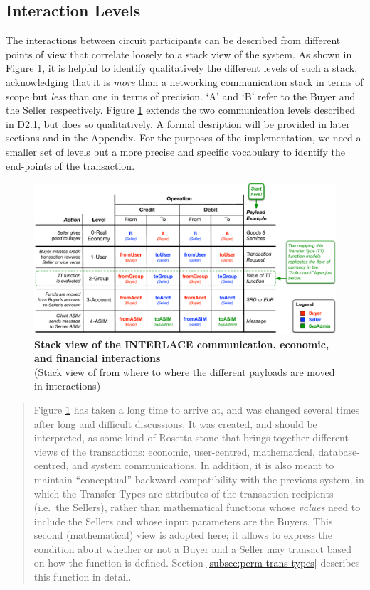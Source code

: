 \subsection{Interaction Levels}
\label{sec:intlevels}
The interactions between circuit participants can be described from different points of view that correlate loosely to a stack view of the system. As shown in Figure \ref{fig:stack}, it is helpful to identify qualitatively the different levels of such a stack, acknowledging that it is \emph{more} than a networking communication stack in terms of scope but \emph{less} than one in terms of precision. `A' and `B' refer to the Buyer and the Seller respectively. Figure \ref{fig:stack} extends the two communication levels described in D2.1, but does so qualitatively. A formal desription will be provided in later sections and in the Appendix. For the purposes of the implementation, we need a smaller set of levels but a more precise and specific vocabulary to identify the end-points of the transaction.
\begin{figure}[H]
\centering
\includegraphics[width=17.5cm]{Figures/Stack}
\caption{\small\textbf{Stack view of the INTERLACE communication, economic, and financial interactions}\\
(Stack view of from where to where the different payloads are moved in interactions)}
\label{fig:stack}
\vspace{-0.3cm}
\end{figure}

\begin{quote}
\small
Figure \ref{fig:stack} has taken a long time to arrive at, and was changed several times after long and difficult discussions. It was created, and should be interpreted, as some kind of Rosetta stone that brings together different views of the transactions: economic, user-centred, mathematical, database-centred, and system communications. In addition, it is also meant to maintain ``conceptual'' backward compatibility with the previous system, in which the Transfer Types are attributes of the transaction recipients (i.e.\ the Sellers), rather than mathematical functions whose \emph{values} need to include the Sellers and whose input parameters are the Buyers. This second (mathematical) view is adopted here; it allows to express the condition about whether or not a Buyer and a Seller may transact based on how the function is defined. Section \ref{subsec:perm-trans-types} describes this function in detail.
\vspace{-0.5cm}
\end{quote}

